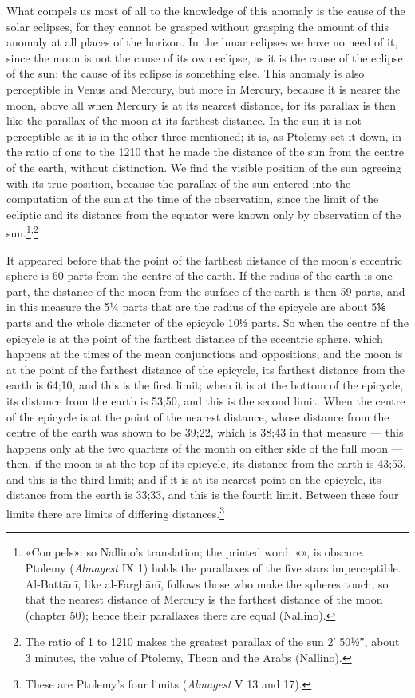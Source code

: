 \documentclass[11pt]{article}
\newcommand{\ArPage}[1]{\marginpar{\footnotesize\color{gray}Ar.\,p.\,#1}}
\begin{document}
\par \ArPage{116}What compels us most of all to the knowledge of this anomaly is the cause of the solar eclipses, for they cannot be grasped without grasping the amount of this anomaly at all places of the horizon. In the lunar eclipses we have no need of it, since the moon is not the cause of its own eclipse, as it is the cause of the eclipse of the sun: the cause of its eclipse is something else. This anomaly is also perceptible in Venus and Mercury, but more in Mercury, because it is nearer the moon, above all when Mercury is at its nearest distance, for its parallax is then like the parallax of the moon at its farthest distance. In the sun it is not perceptible as it is in the other three mentioned; it is, as Ptolemy set it down, in the ratio of one to the 1210 that he made the distance of the sun from the centre of the earth, without distinction. We find the visible position of the sun agreeing with its true position, because the parallax of the sun entered into the computation of the sun at the time of the observation, since the limit of the ecliptic and its distance from the equator were known only by observation of the sun.\footnote{«Compels»: so Nallino's translation; the printed word, «», is obscure. Ptolemy (\emph{Almagest} IX 1) holds the parallaxes of the five stars imperceptible. Al-Battānī, like al-Farghānī, follows those who make the spheres touch, so that the nearest distance of Mercury is the farthest distance of the moon (chapter 50); hence their parallaxes there are equal (Nallino).}\textsuperscript{,}\footnote{The ratio of 1 to 1210 makes the greatest parallax of the sun 2′ 50½″, about 3 minutes, the value of Ptolemy, Theon and the Arabs (Nallino).}\par
\par It appeared before that the point of the farthest distance of the moon's eccentric sphere is 60 parts from the centre of the earth. If the radius of the earth is one part, the distance of the moon from the surface of the earth is then 59 parts, and in this measure the 5¼ parts that are the radius of the epicycle are about 5⅙ parts and the whole diameter of the epicycle 10⅓ parts. So when the centre of the epicycle is at the point of the farthest distance of the eccentric sphere, which happens at the times of the mean conjunctions and oppositions, and the moon is at the point of the farthest distance of the epicycle, its farthest distance from the earth is 64;10, and this is the first limit; when it is at the bottom of the epicycle, its distance from the earth is 53;50, and this is the second limit. When the centre of the epicycle is at the point of the nearest distance, whose distance from the centre of the earth was shown to be 39;22, which is 38;43 in that measure — this happens only at the two quarters of the month on either side of the full moon — then, if the moon is at the top of its epicycle, its distance from the earth is 43;53, and this is the third limit; and if it is at its nearest point on the epicycle, its distance from the earth is 33;33, and this is the fourth limit. Between these four limits there are limits of differing distances.\footnote{These are Ptolemy's four limits (\emph{Almagest} V 13 and 17).}\par
\end{document}
